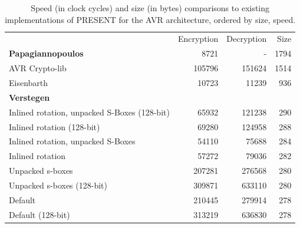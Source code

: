 \documentclass[11pt]{llncs2e} %
\begin{document}

\begin{table}[h]
\centering
\footnotesize
	\begin{tabular}{ l r r r }
		& Encryption & Decryption & Size \\
	\textbf{Papagiannopoulos}~\cite{kostas_code} & 8721 & - & 1794 \\
	AVR Crypto-lib~\cite{avr_crypto_lib} & 105796 & 151624 & 1514 \\
	Eisenbarth~\cite{eisenbarth2012compact} & 10723 & 11239 & 936 \\
	\textbf{Verstegen}~\cite{aram_code} & & & \\
	\hspace{0.4em} Inlined rotation, unpacked S-Boxes (128-bit) & 65932 & 121238 & 290 \\
	\hspace{0.4em} Inlined rotation (128-bit) & 69280	& 124958 & 288 \\
	\hspace{0.4em} Inlined rotation, unpacked S-Boxes & 54110 & 75688 & 284 \\
	\hspace{0.4em} Inlined rotation & 57272 & 79036 & 282 \\
	\hspace{0.4em} Unpacked s-boxes & 207281 & 276568 & 280 \\
	\hspace{0.4em} Unpacked s-boxes (128-bit) & 309871 & 633110 & 280 \\
	\hspace{0.4em} Default & 210445 & 279914 & 278 \\
	\hspace{0.4em} Default (128-bit) & 313219 & 636830 & 278 \\
	\end{tabular}
	\caption{\footnotesize Speed (in clock cycles) and size (in bytes) comparisons to existing implementations of PRESENT for the AVR architecture, ordered by size, speed.}
	\label{numbers}
\end{table}

{}

\end{document}
